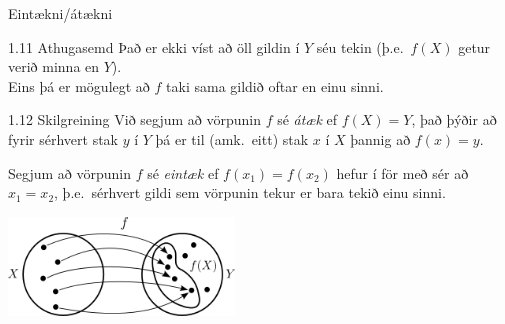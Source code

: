\documentclass[icelandic,a4paper,12pt]{article}
\begin{document}
\begin{frame}{Eintækni/átækni}
\begin{block}{1.11 Athugasemd}
Það er ekki víst að öll gildin í $Y$ séu tekin (þ.e.~$f(X)$
getur verið minna en $Y$).\\ Eins þá er mögulegt að $f$
taki sama gildið oftar en einu sinni.
\end{block}

\pause

\begin{block}{1.12 Skilgreining}
Við segjum að vörpunin $f$ sé \emph{átæk} ef $f(X)=Y$, það þýðir að 
fyrir sérhvert stak $y$ í $Y$ þá er til (amk.~eitt) stak
$x$ í $X$ þannig að $f(x)=y$.

\pause

Segjum að vörpunin $f$ sé \emph{eintæk} ef $f(x_1) = f(x_2)$ 
hefur í för með sér að $x_1=x_2$, þ.e.~sérhvert gildi sem
vörpunin tekur er bara tekið einu sinni.
\end{block}

\begin{center}
 \includegraphics[width=6cm,keepaspectratio=true]{./myndir/kafli01/02_Mynd_vorpunar.png}
\end{center}

\end{frame}
\end{document}

